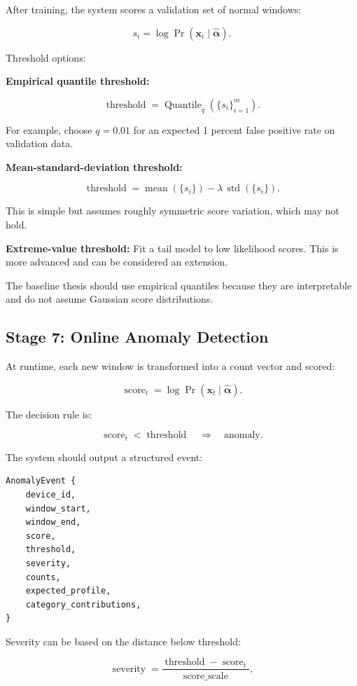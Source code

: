 \documentclass[11pt,a4paper]{article}
\begin{document}
After training, the system scores a validation set of normal windows:

\[
s_i=\log\Pr(\mathbf{x}_i\mid\hat{\boldsymbol{\alpha}}).
\]

Threshold options:

\textbf{Empirical quantile threshold:}

\[
\operatorname{threshold}=\operatorname{Quantile}_q(\{s_i\}_{i=1}^{m}).
\]

For example, choose \(q=0.01\) for an expected 1 percent false positive rate on validation data.

\textbf{Mean-standard-deviation threshold:}

\[
\operatorname{threshold}
=
\operatorname{mean}(\{s_i\})
-\lambda\,\operatorname{std}(\{s_i\}).
\]

This is simple but assumes roughly symmetric score variation, which may not hold.

\textbf{Extreme-value threshold:} Fit a tail model to low likelihood scores. This is more advanced and can be considered an extension.

The baseline thesis should use empirical quantiles because they are interpretable and do not assume Gaussian score distributions.

\subsection{Stage 7: Online Anomaly Detection}

At runtime, each new window is transformed into a count vector and scored:

\[
\operatorname{score}_t
=
\log\Pr(\mathbf{x}_t\mid\hat{\boldsymbol{\alpha}}).
\]

The decision rule is:

\[
\operatorname{score}_t<\operatorname{threshold}
\quad\Longrightarrow\quad
\mathrm{anomaly}.
\]

The system should output a structured event:

\begin{lstlisting}
AnomalyEvent {
    device_id,
    window_start,
    window_end,
    score,
    threshold,
    severity,
    counts,
    expected_profile,
    category_contributions,
}
\end{lstlisting}

Severity can be based on the distance below threshold:

\[
\operatorname{severity}
=
\frac{\operatorname{threshold}-\operatorname{score}_t}
{\mathrm{score\_scale}},
\]
\end{document}
